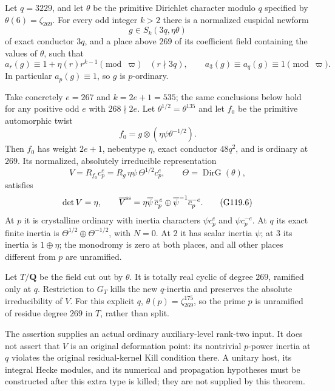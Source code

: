 \begin{theorem}
\label{prop:cubic-auxiliary-order269-seed}
Let $q=3229$, and let $\theta$ be the primitive Dirichlet character
modulo $q$ specified by $\theta(6)=\zeta_{269}$.
For every odd integer $k>2$ there is a normalized cuspidal newform
\[
 g\in S_k(3q,\eta\theta)
 \tag{G119.2}
\]
of exact conductor $3q$, and a place above $269$ of its coefficient
field containing the values of $\theta$, such that
\[
 a_r(g)\equiv 1+\eta(r)r^{k-1}\pmod{\varpi}
 \quad(r\nmid3q),\qquad
 a_3(g)\equiv a_q(g)\equiv1\pmod{\varpi}.
 \tag{G119.3}
\]
In particular $a_p(g)\equiv1$, so $g$ is $p$-ordinary.

Take concretely $e=267$ and $k=2e+1=535$; the same conclusions below
hold for any positive odd $e$ with $268\nmid2e$.
Let $\theta^{1/2}=\theta^{135}$ and let $f_0$ be the primitive
automorphic twist
\[
 f_0=g\otimes(\eta\psi\theta^{-1/2}).
 \tag{G119.4}
\]
Then $f_0$ has weight $2e+1$, nebentype $\eta$, exact conductor
$48q^2$, and is ordinary at $269$.
Its normalized, absolutely irreducible representation
\[
 V=R_{f_0}c_p^e
   =R_g\,\eta\psi\,\Theta^{1/2}c_p^e,
 \qquad \Theta=\operatorname{DirG}(\theta),
 \tag{G119.5}
\]
satisfies
\[
 \det V=\eta,\qquad
 \overline V^{\rm ss}
   =\eta\overline\psi\,\overline c_p^{\,e}
       \oplus\overline\psi^{-1}\overline c_p^{-e}.
 \tag{G119.6}
\]
At $p$ it is crystalline ordinary with inertia characters
$\psi c_p^e$ and $\psi c_p^{-e}$.
At $q$ its exact finite inertia is
$\Theta^{1/2}\oplus\Theta^{-1/2}$, with $N=0$.
At $2$ it has scalar inertia $\psi$; at $3$ its inertia is
$1\oplus\eta$; the monodromy is zero at both places, and all other
places different from $p$ are unramified.

Let $T/\mathbf Q$ be the field cut out by $\theta$.
It is totally real cyclic of degree $269$, ramified only at $q$.
Restriction to $G_T$ kills the new $q$-inertia and preserves the
absolute irreducibility of $V$.
For this explicit $q$, $\theta(p)=\zeta_{269}^{175}$, so the prime
$p$ is unramified of residue degree $269$ in $T$, rather than split.

The assertion supplies an actual ordinary auxiliary-level rank-two
input.  It does not assert that $V$ is an original deformation point:
its nontrivial $p$-power inertia at $q$ violates the original
residual-kernel Kill condition there.  A unitary host, its integral
Hecke modules, and its numerical and propagation hypotheses must be
constructed after this extra type is killed; they are not supplied by
this theorem.
\end{theorem}

